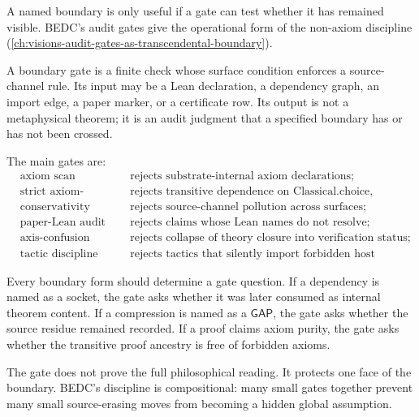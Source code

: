 A named boundary is only useful if a gate can test whether it has remained visible. BEDC's audit gates give the operational form of the non-axiom discipline (\autoref{ch:visions-audit-gates-as-transcendental-boundary}).

\begin{definition}
\label{def:external-supply-boundary-gate}
A boundary gate is a finite check whose surface condition enforces a source-channel rule. Its input may be a Lean declaration, a dependency graph, an import edge, a paper marker, or a certificate row. Its output is not a metaphysical theorem; it is an audit judgment that a specified boundary has or has not been crossed.
\end{definition}

The main gates are:
$$
\begin{aligned}
&\text{axiom scan} && \text{rejects substrate-internal axiom declarations;} \\
&\text{strict axiom-purity} && \text{rejects transitive dependence on Classical.choice, Quot.sound, propext;} \\
&\text{conservativity audit} && \text{rejects source-channel pollution across surfaces;} \\
&\text{paper-Lean audit} && \text{rejects claims whose Lean names do not resolve;} \\
&\text{axis-confusion gate} && \text{rejects collapse of theory closure into verification status;} \\
&\text{tactic discipline} && \text{rejects tactics that silently import forbidden host commitments.}
\end{aligned}
$$

\begin{principle}
\label{prin:external-supply-gate-correspondence}
Every boundary form should determine a gate question. If a dependency is named as a socket, the gate asks whether it was later consumed as internal theorem content. If a compression is named as a $\mathsf{GAP}$, the gate asks whether the source residue remained recorded. If a proof claims axiom purity, the gate asks whether the transitive proof ancestry is free of forbidden axioms.
\end{principle}

The gate does not prove the full philosophical reading. It protects one face of the boundary. BEDC's discipline is compositional: many small gates together prevent many small source-erasing moves from becoming a hidden global assumption.

